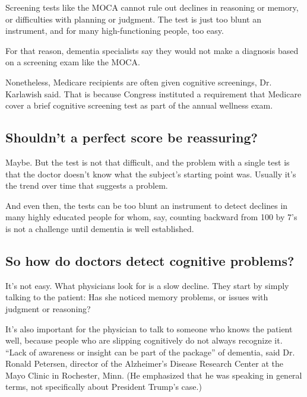 Screening tests like the MOCA cannot rule out declines in reasoning or
memory, or difficulties with planning or judgment. The test is just too
blunt an instrument, and for many high-functioning people, too easy.

For that reason, dementia specialists say they would not make a
diagnosis based on a screening exam like the MOCA.

Nonetheless, Medicare recipients are often given cognitive screenings,
Dr. Karlawish said. That is because Congress instituted a requirement
that Medicare cover a brief cognitive screening test as part of the
annual wellness exam.

\hypertarget{shouldnt-a-perfect-score-be-reassuring}{%
\subsection{Shouldn't a perfect score be
reassuring?}\label{shouldnt-a-perfect-score-be-reassuring}}

Maybe. But the test is not that difficult, and the problem with a single
test is that the doctor doesn't know what the subject's starting point
was. Usually it's the trend over time that suggests a problem.

And even then, the tests can be too blunt an instrument to detect
declines in many highly educated people for whom, say, counting backward
from 100 by 7's is not a challenge until dementia is well established.

\hypertarget{so-how-do-doctors-detect-cognitive-problems}{%
\subsection{So how do doctors detect cognitive
problems?}\label{so-how-do-doctors-detect-cognitive-problems}}

It's not easy. What physicians look for is a slow decline. They start by
simply talking to the patient: Has she noticed memory problems, or
issues with judgment or reasoning?

It's also important for the physician to talk to someone who knows the
patient well, because people who are slipping cognitively do not always
recognize it. ``Lack of awareness or insight can be part of the
package'' of dementia, said Dr. Ronald Petersen, director of the
Alzheimer's Disease Research Center at the Mayo Clinic in Rochester,
Minn. (He emphasized that he was speaking in general terms, not
specifically about President Trump's case.)

